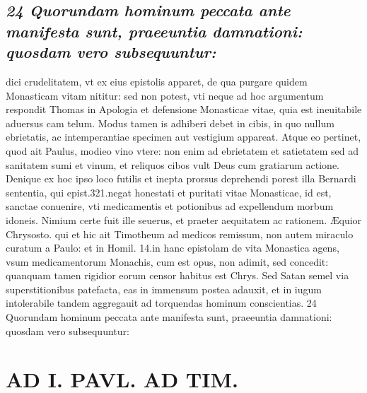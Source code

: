 \documentclass{article}
\begin{document}
\begin{pages}
\subsection*{\textit{24 Quorundam hominum peccata ante manifesta sunt, praeeuntia damnationi: quosdam vero subsequuntur:}}dici crudelitatem, vt ex eius epistolis apparet, de qua purgare quidem Monasticam vitam nititur: sed non potest, vti neque ad hoc argumentum respondit Thomas in Apologia et defensione Monasticae vitae, quia est ineuitabile aduersus cam telum. Modus tamen is adhiberi debet in cibis, in quo nullum ebrietatis, ac intemperantiae specimen aut vestigium appareat. Atque eo pertinet, quod ait Paulus, modieo vino vtere: non enim ad ebrietatem et satietatem sed ad sanitatem sumi et vinum, et reliquos cibos vult Deus cum gratiarum actione. Denique ex hoc ipso loco futilis et inepta prorsus deprehendi porest illa Bernardi sententia, qui epist.321.negat honestati et puritati vitae Monasticae, id est, sanctae conuenire, vti medicamentis et potionibus ad expellendum morbum idoneis. Nimium certe fuit ille seuerus, et praeter aequitatem ac rationem. Æquior Chrysosto. qui et hic ait Timotheum ad medicos remissum, non autem miraculo curatum a Paulo: et in Homil. 14.in hanc epistolam de vita Monastica agens, vsum medicamentorum Monachis, cum est opus, non adimit, sed concedit: quanquam tamen rigidior eorum censor habitus est Chrys. Sed Satan semel via superstitionibus patefacta, eas in immensum postea adauxit, et in iugum intolerabile tandem aggregauit ad torquendas hominum conscientias. 24 Quorundam hominum peccata ante manifesta sunt, praeeuntia damnationi: quosdam vero subsequuntur:  \pend
\section*{AD I. PAVL. AD TIM. }
\marginpar{[ p.904 ]}\pstart {}
{}

\end{pages}
\end{document}
